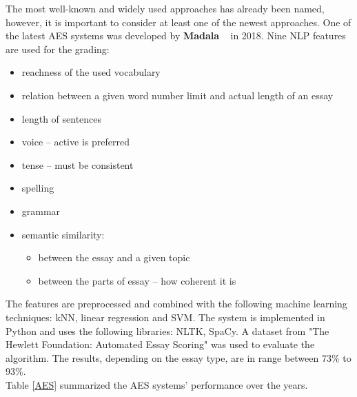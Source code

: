 The most well-known and widely used approaches has already been named, however, it is important to consider at least one of the newest approaches. One of the latest AES systems was developed by \textbf{Madala} ~\cite{Madala} in 2018. Nine NLP features are used for the grading: 
\begin{itemize}
\item reachness of the used vocabulary 
\item relation between a given word number limit and actual length of an essay
\item length of sentences
\item voice -- active is preferred
\item tense -- must be consistent
\item spelling
\item grammar
\item semantic similarity:
\begin{itemize}
\item between the essay and a given topic
\item between the parts of essay -- how coherent it is
\end{itemize} 
\end{itemize}

The features are preprocessed and combined with the following machine learning techniques: kNN, linear regression and SVM. The system is implemented in Python and uses the following libraries: NLTK, SpaCy. A dataset from "The Hewlett Foundation: Automated Essay Scoring"  was used to evaluate the algorithm. The results, depending on the essay type, are in range between 73\% to 93\%. \\

Table \ref{AES} summarized the AES systems' performance over the years.\\

